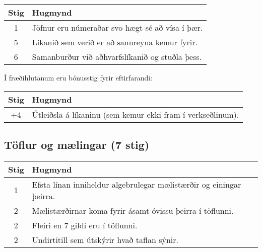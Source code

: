 \begin{tcolorbox}
\begin{table}[H]
    \centering
    \begin{tabular}{|c|l|}
    \hline
       \textbf{Stig}  & \textbf{Hugmynd}   \\ \hline \hline
        1  & Jöfnur eru númeraðar svo hægt sé að vísa í þær.  \\ \hline
        5 & Líkanið sem verið er að sannreyna kemur fyrir. \\\hline
        6  & Samanburður við aðhvarfslíkanið og stuðla þess. \\\hline
    \end{tabular}
\end{table}

Í fræðihlutanum eru bónusstig fyrir eftirfarandi:

\begin{table}[H]
    \centering
    \begin{tabular}{|c|l|}
    \hline
       \textbf{Stig}  & \textbf{Hugmynd}   \\ \hline \hline
        +4  & Útleiðsla á líkaninu (sem kemur ekki fram í verkseðlinum).
        \\\hline
    \end{tabular}
\end{table}

\subsection*{Töflur og mælingar (7 stig)}

\begin{table}[H]
    \centering
    \begin{tabular}{|c|l|}
    \hline
       \textbf{Stig}  & \textbf{Hugmynd}   \\ \hline \hline
        1  & Efsta línan inniheldur algebrulegar mælistærðir og einingar þeirra. \\ \hline
        2 & Mælistærðirnar koma fyrir ásamt óvissu þeirra í töflunni. \\ \hline
        2  & Fleiri en 7 gildi eru í töflunni. \\ \hline
        2  & Undirtitill sem útskýrir hvað taflan sýnir. \\ \hline
    \end{tabular}
\end{table}

\end{tcolorbox}

\newpage

